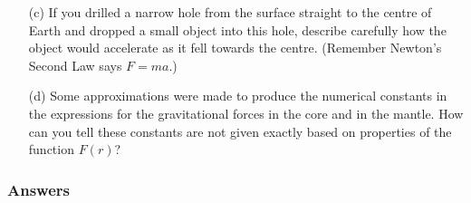 \documentclass{exam}
\begin{document}
\begin{questions}
\begin{enumerate}
\item[(c)] If you drilled a narrow hole from the surface straight to the centre of Earth and dropped a small object into this hole, describe carefully how the object would accelerate as it fell towards the centre. (Remember Newton's Second Law says $F=ma$.)

\item[(d)] Some approximations were made to produce the numerical constants in the expressions for the gravitational forces in the core and in the mantle. How can you tell these constants are not given exactly based on properties of the function $F(r)$?

\end{enumerate}

\color{blue}
\subsubsection*{Answers}
\end{questions}
\end{document}

